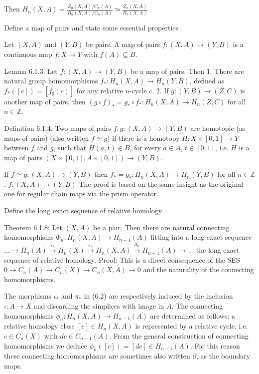 Then \( H_n(X, A) = \frac{Z_n(X, A)/C_n(A)}{B_n(X, A)/C_n(A)} \simeq \frac{Z_n(X, A)}{B_n(X, A)} \)

Define a map of pairs and state some essential properties

Let \((X, A)\) and \((Y, B)\) be pairs.
A map of pairs \(f: (X, A) \to (Y, B)\) is a continuous map \(f: X \to Y\) with \(f(A) \subseteq B\).

Lemma 6.1.3. 
Let \(f : (X, A) \to (Y, B)\) be a map of pairs. Then
1. There are natural group homomorphisms \(f_*: H_n(X, A) \to H_n(Y, B)\), defined as \(f_*([c]) = [f_\sharp(c)]\) for any relative \(n\)-cycle \(c\).
2. If \(g: (Y, B) \to (Z, C)\) is another map of pairs, then \((g \circ f)_* = g_* \circ f_*: H_n(X, A) \to H_n(Z, C)\) for all \(n \in \mathbb{Z}\).

Definition 6.1.4. 
Two maps of pairs \(f, g: (X, A) \to (Y, B)\) are homotopic (as maps of pairs) (also written \(f \simeq g\)) 
if there is a homotopy \(H: X \times [0, 1] \to Y\) between \(f\) and \(g\), such that \(H(a, t) \in B\), 
for every \(a \in A\), \(t \in [0, 1]\), i.e. \(H\) is a map of pairs \((X \times [0, 1], A \times [0, 1]) \to (Y, B)\).

If \( f \simeq g : (X, A) \to (Y, B) \) then \( f_{\ast} = g_{\ast} : H_n(X, A) \to H_n(Y, B)\) for all \( n \in \mathbb{Z} \).
\( f : (X, A) \to (Y, B) \)
The proof is based on the same insight as the original one for regular chain maps via the prism operator. 

Define the long exact sequence of relative homology

Theorem 6.1.8:
Let \((X, A)\) be a pair. Then there are natural connecting homomorphisms \(\Phi_n: H_n(X, A) \to H_{n-1}(A)\) fitting into a long exact sequence
\(\dots \longrightarrow H_n(A) \xrightarrow{\iota_*} H_n(X) \xrightarrow{\pi_*} H_n(X, A) \xrightarrow{\partial_n} H_{n-1}(A) \longrightarrow \dots\)
the long exact sequence of relative homology.
Proof:
This is a direct consequence of the SES
\( 0 \longrightarrow C_n(A) \longrightarrow C_n(X) \longrightarrow C_n(X, A) \to 0\)
and the naturality of the connecting homomorphisms.

The morphisms \(\iota_*\) and \(\pi_*\) in (6.2) are respectively induced by the inclusion \(\iota: A \to X\) and 
discarding the simplices with image in \(A\). The connecting homomorphisms \(\phi_n: H_n(X, A) \to H_{n-1}(A)\) are determined as follows: 
a relative homology class \([c] \in H_n(X, A)\) is represented by a relative cycle, i.e. \(c \in C_n(X)\) with \(dc \in C_{n-1}(A)\). 
From the general construction of connecting homomorphisms we deduce \(\phi_n([c]) = [dc] \in H_{n-1}(A)\). 
For this reason these connecting homomorphisms are sometimes also written \(\partial\), as the boundary maps.

